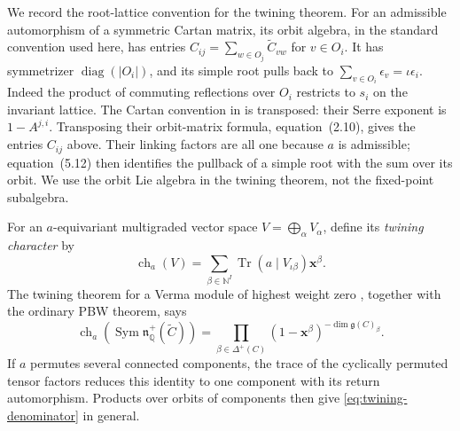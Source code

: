 \documentclass[11pt, reqno]{amsart}
\numberwithin{equation}{section}
\theoremstyle{definition}
\theoremstyle{remark}
\newcommand{\op}[1]{\operatorname{#1}}
\newcommand{\mb}[1]{\mathbb{#1}}
\newcommand{\Tr}{\op{Tr}}
\begin{document}
We record the root-lattice convention for the twining theorem. For an
admissible automorphism of a symmetric Cartan matrix, its orbit
algebra, in the standard convention used here, has entries
$C_{ij}=\sum_{w\in O_j}\widetilde C_{v w}$ for $v\in O_i$.
It has symmetrizer $\op{diag}(|O_i|)$, and its simple root
pulls back to $\sum_{v\in O_i}\epsilon_v=\iota\epsilon_i$.
Indeed the product of commuting reflections over $O_i$ restricts to
$s_i$ on the invariant lattice. The Cartan convention in
\cite[equation~(3.1)]{FSS} is transposed: their Serre exponent is
$1-A^{j,i}$. Transposing their orbit-matrix formula, equation~(2.10),
gives the entries $C_{ij}$ above. Their linking factors are all one
because $a$ is admissible; equation~(5.12) then identifies the pullback
of a simple root with the sum over its orbit. We use the orbit Lie algebra in the twining theorem, not
the fixed-point subalgebra.

For an $a$-equivariant multigraded vector space
$V=\bigoplus_\alpha V_\alpha$, define its \emph{twining character} by
\[ \op{ch}_a(V)=\sum_{\beta\in\mb N^I}
   \Tr\!\left(a\mid V_{\iota\beta}\right)\mathbf x^\beta. \] The twining theorem for a Verma module of
highest weight zero \cite[Theorem~1(a)]{FSS}, together with the ordinary
PBW theorem, says
\begin{equation}\label{eq:twining-denominator} \op{ch}_a\!\left( \op{Sym}\mathfrak n_{\mb Q}^+(\widetilde C)\right) =\prod_{\beta\in\Delta^+(C)} (1-\mathbf x^\beta)^{-\dim\mathfrak g(C)_\beta}.\end{equation}
If $a$ permutes several connected components,
the trace of the cyclically permuted tensor factors reduces this
identity to one component with its return automorphism. Products over
orbits of components then give \eqref{eq:twining-denominator} in general.
\end{document}
